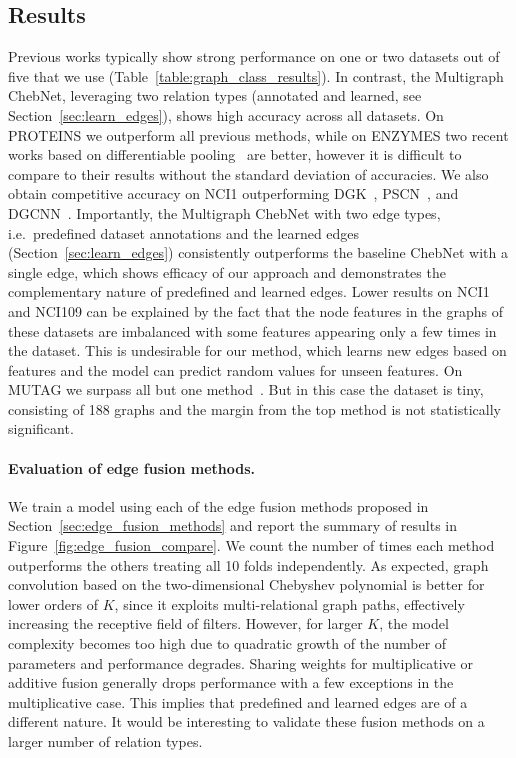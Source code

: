 \documentclass[final,nonatbib]{article} \usepackage{nips_2018}
\begin{document}
	\vspace{-3pt}
	\subsection{Results}
	\label{sec:results}

	Previous works typically show strong performance on one or two datasets out of five that we use (Table~\ref{table:graph_class_results}). In contrast, the Multigraph ChebNet, leveraging two relation types (annotated and learned, see Section~\ref{sec:learn_edges}), shows high accuracy across all datasets.
	On PROTEINS we outperform all previous methods, while on ENZYMES two recent works based on differentiable pooling~\cite{ying2018hierarchical, cangea2018towards} are better,
	however it is difficult to compare to their results without the standard deviation of accuracies. We	also obtain competitive accuracy on NCI1 outperforming DGK~\cite{yanardag2015deep}, PSCN~\cite{niepert2016learning}, and DGCNN~\cite{zhang2018end}.
	Importantly, the Multigraph ChebNet with two edge types, i.e.~predefined dataset annotations and the learned edges (Section~\ref{sec:learn_edges}) consistently outperforms the baseline ChebNet with a single edge, which shows efficacy of our approach and demonstrates the complementary nature of predefined and learned edges.
	Lower results on NCI1 and NCI109 can be explained by the fact that the node features in the graphs of these datasets are imbalanced with some features appearing only a few times in the dataset. This is undesirable for our method, which learns new edges based on features and the model can predict random values for unseen features.
	On MUTAG we surpass all but one method~\cite{niepert2016learning}. But in this case the dataset is tiny, consisting of 188 graphs and the margin from the top method is not statistically significant.


	\paragraph{Evaluation of edge fusion methods.}
	We train a model using each of the edge fusion methods proposed in Section~\ref{sec:edge_fusion_methods} and report the summary of results in Figure~\ref{fig:edge_fusion_compare}. We count the number of times each method outperforms the others treating all 10 folds independently.
	As expected, graph convolution based on the two-dimensional Chebyshev polynomial is better for lower orders of $K$, since it exploits multi-relational graph paths, effectively increasing the receptive field of filters.
	However, for larger $K$, the model complexity becomes too high due to quadratic growth of the number of parameters and performance degrades.
	Sharing weights for multiplicative or additive fusion generally drops performance with a few exceptions in the multiplicative case. This implies that predefined and learned edges are of a different nature. It would be interesting to validate these fusion methods on a larger number of relation types.
\end{document}
